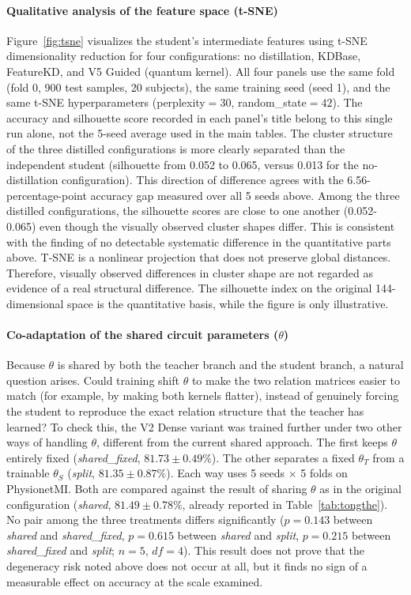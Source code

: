 \paragraph{Qualitative analysis of the feature space (t-SNE)}

Figure~\ref{fig:tsne} visualizes the student's intermediate features
using t-SNE dimensionality reduction for four configurations: no
distillation, KDBase, FeatureKD, and V5 Guided (quantum kernel). All
four panels use the same fold (fold 0, 900 test samples, 20
subjects), the same training seed (seed 1), and the same t-SNE
hyperparameters (perplexity$=30$, random\_state$=42$). The accuracy
and silhouette score recorded in each panel's title belong to this
single run alone, not the 5-seed average used in the main tables.
The cluster structure of the three distilled configurations is more
clearly separated than the independent student (silhouette from
0.052 to 0.065, versus 0.013 for the no-distillation configuration).
This direction of difference agrees with the 6.56-percentage-point
accuracy gap measured over all 5 seeds above. Among the three
distilled configurations, the silhouette scores are close to one
another (0.052-0.065) even though the visually observed cluster
shapes differ. This is consistent with the finding of no detectable
systematic difference in the quantitative parts above. T-SNE is a
nonlinear projection that does not preserve global distances.
Therefore, visually observed differences in cluster shape are not
regarded as evidence of a real structural difference. The silhouette
index on the original 144-dimensional space is the quantitative
basis, while the figure is only illustrative.

\paragraph{Co-adaptation of the shared circuit parameters ($\theta$)}

Because $\theta$ is shared by both the teacher branch and the
student branch, a natural question arises. Could training shift
$\theta$ to make the two relation matrices easier to match (for
example, by making both kernels flatter), instead of genuinely
forcing the student to reproduce the exact relation structure that
the teacher has learned? To check this, the V2 Dense variant was
trained further under two other ways of handling $\theta$, different
from the current shared approach. The first keeps $\theta$ entirely
fixed (\emph{shared\_fixed}, $81.73\pm0.49\%$). The other separates
a fixed $\theta_T$ from a trainable $\theta_S$ (\emph{split},
$81.35\pm0.87\%$). Each way uses 5 seeds $\times$ 5 folds on
PhysionetMI. Both are compared against the result of sharing $\theta$
as in the original configuration (\emph{shared}, $81.49\pm0.78\%$,
already reported in Table~\ref{tab:tongthe}). No pair among the
three treatments differs significantly ($p=0.143$ between
\emph{shared} and \emph{shared\_fixed}, $p=0.615$ between
\emph{shared} and \emph{split}, $p=0.215$ between
\emph{shared\_fixed} and \emph{split}; $n=5$, $df=4$). This result
does not prove that the degeneracy risk noted above does not occur
at all, but it finds no sign of a measurable effect on accuracy at
the scale examined.

